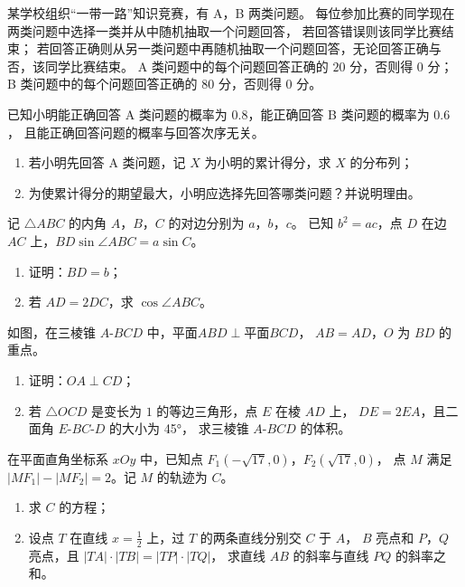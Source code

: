 \documentclass{exam-zh}
\begin{document}
\begin{problem}[points = 12]
  某学校组织“一带一路”知识竞赛，有 A，B 两类问题。
  每位参加比赛的同学现在两类问题中选择一类并从中随机抽取一个问题回答，
  若回答错误则该同学比赛结束；
  若回答正确则从另一类问题中再随机抽取一个问题回答，无论回答正确与否，该同学比赛结束。
  A 类问题中的每个问题回答正确的 $20$ 分，否则得 $0$ 分；
  B 类问题中的每个问题回答正确的 $80$ 分，否则得 $0$ 分。

  已知小明能正确回答 A 类问题的概率为 $0.8$，能正确回答 B 类问题的概率为 $0.6$，
  且能正确回答问题的概率与回答次序无关。
  \begin{enumerate}
    \item 若小明先回答 A 类问题，记 $X$ 为小明的累计得分，求 $X$ 的分布列；
    \item 为使累计得分的期望最大，小明应选择先回答哪类问题？并说明理由。
  \end{enumerate}
\end{problem}

\begin{problem}[points = 12]
  记 $\triangle ABC$ 的内角 $A$，$B$，$C$ 的对边分别为 $a$，$b$，$c$。
  已知 $b^2 = ac$，点 $D$ 在边 $AC$ 上，$BD \sin\angle ABC = a \sin C$。
  \nopagebreak
  \begin{enumerate}
    \item 证明：$BD = b$；
    \item 若 $AD = 2 DC$，求 $\cos\angle ABC$。
  \end{enumerate}
\end{problem}

\begin{problem}[points = 12]
  如图，在三棱锥 $A$-$BCD$ 中，$\text{平面} ABD \perp \text{平面} BCD$，
  $AB = AD$，$O$ 为 $BD$ 的重点。
  \begin{enumerate}
    \item 证明：$OA \perp CD$；
    \item 若 $\triangle OCD$ 是变长为 $1$ 的等边三角形，点 $E$ 在棱 $AD$ 上，
      $DE = 2 EA$，且二面角 $E$-$BC$-$D$ 的大小为 \ang{45}，
      求三棱锥 $A$-$BCD$ 的体积。
  \end{enumerate}
\end{problem}

\begin{problem}[points = 12]
  在平面直角坐标系 $xOy$ 中，已知点 $F_1 (-\sqrt{17}, 0)$，$F_2 (\sqrt{17}, 0)$，
  点 $M$ 满足 $|M F_1| - |M F_2| = 2$。记 $M$ 的轨迹为 $C$。
  \begin{enumerate}
    \item 求 $C$ 的方程；
    \item 设点 $T$ 在直线 $x = \frac{1}{2}$ 上，过 $T$ 的两条直线分别交 $C$ 于 $A$，
      $B$ 亮点和 $P$，$Q$ 亮点，且 $|TA| \cdot |TB| = |TP| \cdot |TQ|$，
      求直线 $AB$ 的斜率与直线 $PQ$ 的斜率之和。
  \end{enumerate}
\end{problem}
\end{document}
